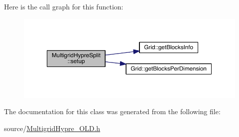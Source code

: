 Here is the call graph for this function\+:\nopagebreak
\begin{figure}[H]
\begin{center}
\leavevmode
\includegraphics[width=350pt]{d0/d0c/class_multigrid_hypre_split_a74904a89baa6f7bbe4647c905ae588df_cgraph}
\end{center}
\end{figure}




The documentation for this class was generated from the following file\+:\begin{DoxyCompactItemize}
\item 
source/\hyperlink{_multigrid_hypre___o_l_d_8h}{Multigrid\+Hypre\+\_\+\+O\+L\+D.\+h}\end{DoxyCompactItemize}
